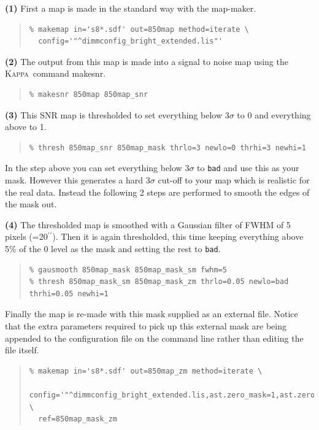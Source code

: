 \documentclass[twoside,11pt]{article}
\newcommand{\xref}[3]{#1}
\renewcommand{\_}{\texttt{\symbol{95}}}
\newcommand{\arcmin}{\mbox{$^\prime$}}
\newcommand{\arcsec}{\arcmin\hspace*{-0.1em}\arcmin}
\newenvironment{myquote}{\begin{quote}\begin{small}}{\end{small}\end{quote}}
\newcommand{\Kappa}{\xref{\textsc{Kappa}}{sun95}{}}
\newcommand{\task}[1]{\textsf{#1}}
\newcommand{\makesnr}{\xref{\task{makesnr}}{sun95}{MAKESNR}}
\begin{document}
\textbf{(1)} First a map is made in the standard way with the map-maker.
\begin{myquote}
\begin{verbatim}
% makemap in='s8*.sdf' out=850map method=iterate \
  config='"^dimmconfig_bright_extended.lis"'
\end{verbatim}
\end{myquote}
\textbf{(2)} The output from this map is made into a signal to noise map using the
\Kappa\ command \makesnr.
\begin{myquote}
\begin{verbatim}
% makesnr 850map 850map_snr
\end{verbatim}
\end{myquote}
\textbf{(3)} This SNR map is thresholded to set everything below 3$\sigma$ to 0 and
everything above to 1.
\begin{myquote}
\begin{verbatim}
% thresh 850map_snr 850map_mask thrlo=3 newlo=0 thrhi=3 newhi=1
\end{verbatim}
\end{myquote}
In the step above you can set everything below 3$\sigma$ to
\texttt{bad} and use this as your mask. However this generates a hard
3$\sigma$ cut-off to your map which is realistic for the real data.
Instead the following 2 steps are performed to smooth the edges of the
mask out.

\textbf{(4)} The thresholded map is smoothed with a Gaussian filter
of FWHM of 5 pixels (=20\arcsec). Then it is again thresholded, this time
keeping everything above 5\% of the 0 level as the mask and setting
the rest to \texttt{bad}.
\begin{myquote}
\begin{verbatim}
% gausmooth 850map_mask 850map_mask_sm fwhm=5
% thresh 850map_mask_sm 850map_mask_zm thrlo=0.05 newlo=bad thrhi=0.05 newhi=1
\end{verbatim}
\end{myquote}
Finally the map is re-made with this mask supplied as an external
file. Notice that the extra parameters required to pick up this external
mask are being appended to the configuration file on the command line
rather than editing the file itself.
\begin{myquote}
\begin{verbatim}
% makemap in='s8*.sdf' out=850map_zm method=iterate \
  config='"^dimmconfig_bright_extended.lis,ast.zero_mask=1,ast.zero_snr=0"' \
  ref=850map_mask_zm
\end{verbatim}
\end{myquote}
\end{document}
